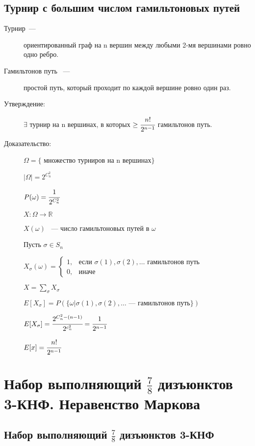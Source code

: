 \documentclass[12pt]{article}
\begin{document}
\subsection{Турнир с большим числом гамильтоновых путей}
\begin{description}
\item[Турнир~---] ориентированный граф на n вершин между любыми 2-мя вершинами ровно одно ребро. 

\item[Гамильтонов путь ~---] простой путь, который проходит по каждой вершине ровно один раз.

\item[Утверждение:] $\exists$ турнир на n вершинах, в которых $\ge \cfrac{n!}{2^{n - 1}}$ гамильтонов путь. 

\item[Доказательство:] 

$\Omega = \{$ множество турниров на n вершинах$\}$

$|\Omega| = 2^{C_n^2}$

$P(\omega) = \cfrac{1}{2^{C_n^2}}$

$X: \Omega \to \mathbb R$

$X(\omega)$ ~--- число гамильтоновых путей в $\omega$

Пусть $\sigma \in S_n$

$X_{\sigma}(\omega) = \begin{cases} 1, & \text{если $\sigma(1), \sigma(2), \ldots$ гамильтонов путь} \\ 0, & \text{иначе}\end{cases}$

$X = \sum_{\sigma} X_{\sigma}$

$E[X_{\sigma}] = P(\{\omega | \sigma(1), \sigma(2), \ldots \text{~--- гамильтонов путь}\})$

$E[X_{\sigma}] = \cfrac{2^{C_n^2 - (n - 1)}}{2^{c_n^2}} = \cfrac{1}{2^{n - 1}}$

$E[x] = \cfrac{n!}{2^{n - 1}}$ 
\end{description}

\section{Набор выполняющий $\frac{7}{8}$ дизъюнктов 3-КНФ. Неравенство Маркова}

\subsection{Набор выполняющий $\frac{7}{8}$ дизъюнктов 3-КНФ}
\end{document}
